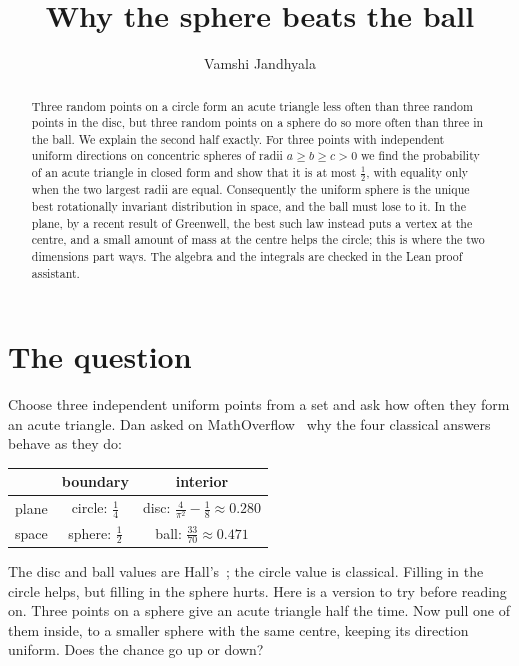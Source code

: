 \documentclass[11pt]{article}
\title{Why the sphere beats the ball}
\author{Vamshi Jandhyala}
\date{}
\theoremstyle{remark}
\begin{document}
\maketitle
\vspace{-2em}

\begin{abstract}
Three random points on a circle form an acute triangle less often than three random points in the disc, but
three random points on a sphere do so more often than three in the ball. We explain the second half exactly.
For three points with independent uniform directions on concentric spheres of radii $a\ge b\ge c>0$ we find the
probability of an acute triangle in closed form and show that it is at most $\frac12$, with equality only when
the two largest radii are equal. Consequently the uniform sphere is the unique best rotationally invariant
distribution in space, and the ball must lose to it. In the plane, by a recent result of Greenwell, the best
such law instead puts a vertex at the centre, and a small amount of mass at the centre helps the circle; this
is where the two dimensions part ways. The algebra and the integrals are checked in the Lean
proof assistant.
\end{abstract}

\section{The question}

Choose three independent uniform points from a set and ask how often they form an acute triangle. Dan asked on
MathOverflow~\cite{MO} why the four classical answers behave as they do:
\begin{center}
\begin{tabular}{lcc}
\toprule
 & boundary & interior \\
\midrule
plane & circle: $\frac14$ & disc: $\frac4{\pi^2}-\frac18\approx0.280$ \\
space & sphere: $\frac12$ & ball: $\frac{33}{70}\approx0.471$ \\
\bottomrule
\end{tabular}
\end{center}
The disc and ball values are Hall's~\cite{Hal82}; the circle value is classical. Filling in the circle helps, but
filling in the sphere hurts. Here is a version to try before reading on. Three points on a sphere give an acute
triangle half the time. Now pull one of them inside, to a smaller sphere with the same centre, keeping its
direction uniform. Does the chance go up or down?
\end{document}
